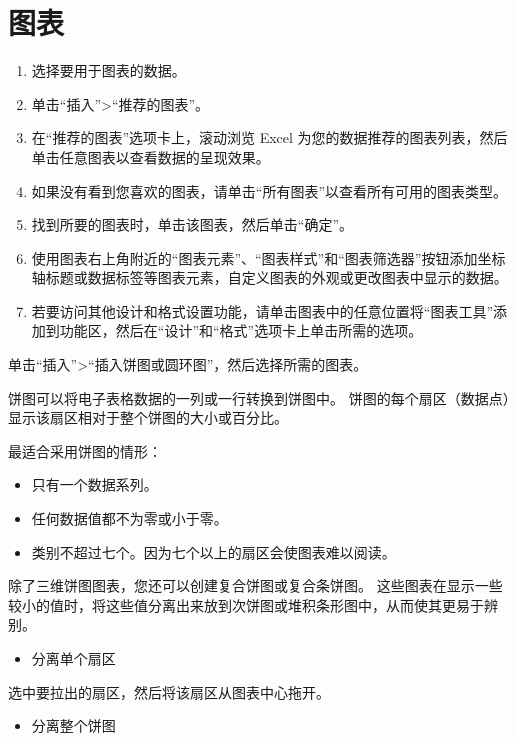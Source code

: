 \section{图表}

{\bfseries {}}
\begin{enumerate}
    \item 选择要用于图表的数据。
    \item 单击“插入”>“推荐的图表”。
    \item 在“推荐的图表”选项卡上，滚动浏览 Excel 为您的数据推荐的图表列表，然后单击任意图表以查看数据的呈现效果。
    \item 如果没有看到您喜欢的图表，请单击“所有图表”以查看所有可用的图表类型。
    \item 找到所要的图表时，单击该图表，然后单击“确定”。
    \item 使用图表右上角附近的“图表元素”、“图表样式”和“图表筛选器”按钮添加坐标轴标题或数据标签等图表元素，自定义图表的外观或更改图表中显示的数据。
    \item 若要访问其他设计和格式设置功能，请单击图表中的任意位置将“图表工具”添加到功能区，然后在“设计”和“格式”选项卡上单击所需的选项。
\end{enumerate}

{\bfseries {}}

单击“插入”>“插入饼图或圆环图”，然后选择所需的图表。

饼图可以将电子表格数据的一列或一行转换到饼图中。 饼图的每个扇区（数据点）显示该扇区相对于整个饼图的大小或百分比。

最适合采用饼图的情形：
\begin{itemize}
    \item 只有一个数据系列。
    \item 任何数据值都不为零或小于零。
    \item 类别不超过七个。因为七个以上的扇区会使图表难以阅读。
\end{itemize}

除了三维饼图图表，您还可以创建复合饼图或复合条饼图。 这些图表在显示一些较小的值时，将这些值分离出来放到次饼图或堆积条形图中，从而使其更易于辨别。

{\bfseries {}}

\begin{itemize}
    \item 分离单个扇区
\end{itemize}

选中要拉出的扇区，然后将该扇区从图表中心拖开。

\begin{itemize}
    \item 分离整个饼图
\end{itemize}

